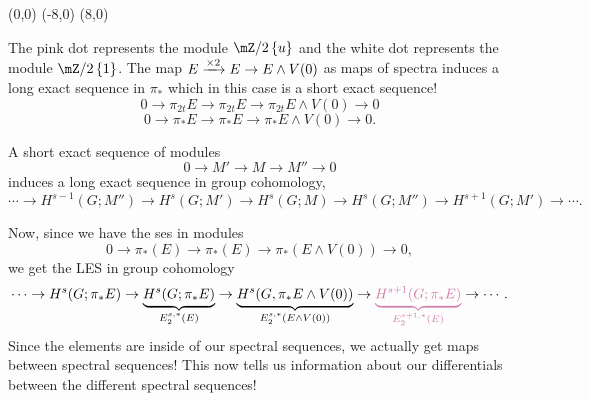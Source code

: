 \begin{sseqdata}[name = EwedgeV0,Adams grading]
        \tenamwednesday(0,0)
        \tenamwednesday(-8,0)
        \tenamwednesday(8,0)
\end{sseqdata}
\begin{center}
    \printpage[name=EwedgeV0,x range = {0}{16}, y range = {0}{6},xscale =.75,grid = chess]
\end{center}
The pink dot represents the module $\mZ/2\sets{u}$ and the white dot represents the module $\mZ/2\sets{1}$. The map $E\xrightarrow{\times 2}E\to E\wedge V(0)$ as maps of spectra induces a long exact sequence in $\pi_\ast$ which in this case is a short exact sequence! $$0\to \pi_{2t}E\to \pi_{2t}E\to \pi_{2t}E\wedge V(0)\to 0$$ $$0\to \pi_{\ast}E\to \pi_{\ast}E\to \pi_{\ast}E\wedge V(0)\to 0.$$
\begin{fact}{}{}
    A short exact sequence of modules $$0\to M'\to M\to M''\to 0$$ induces a long exact sequence in group cohomology, $$\cdots \to H^{s-1}(G;M'')\to H^s(G;M')\to H^s(G;M)\to H^s(G;M'')\to H^{s+1}(G;M')\to \cdots.$$
\end{fact}
Now, since we have the ses in modules $$0\to \pi_\ast(E)\to\pi_\ast(E)\to\pi_\ast(E\wedge V(0))\to 0,$$ we get the LES in group cohomology $$\cdots \to H^s(G;\pi_\ast E)\to \underbrace{H^s(G;\pi_\ast E)}_{E_2^{s,\ast}(E)}\to \underbrace{H^s(G,\pi_\ast E\wedge V(0))}_{E_2^{s,\ast}(E\wedge V(0))}\to \textcolor{wongpink}{\underbrace{H^{s+1}(G;\pi_{\ast}E)}_{E_2^{s+1,\ast}(E)}}\to \cdots.$$ Since the elements are inside of our spectral sequences, we actually get maps between spectral sequences! This now tells us information about our differentials between the different spectral sequences!